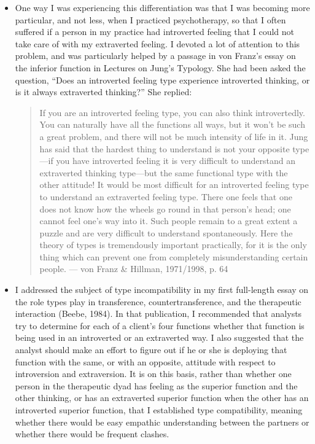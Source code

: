 \begin{itemize}
\item One way I was experiencing this differentiation was that I was becoming
more particular, and not less, when I practiced psychotherapy, so that I often
suffered if a person in my practice had introverted feeling that I could not
take care of with my extraverted feeling. I devoted a lot of attention to this
problem, and was particularly helped by a passage in von Franz's essay on the
inferior function in Lectures on Jung's Typology. She had been asked the
question, ``Does an introverted feeling type experience introverted thinking, or
is it always extraverted thinking?'' She replied:
\begin{quote}
If you are an introverted feeling type, you can also think introvertedly. You
can naturally have all the functions all ways, but it won't be such a great
problem, and there will not be much intensity of life in it. Jung has said that
the hardest thing to understand is not your opposite type—if you have
introverted feeling it is very difficult to understand an extraverted thinking
type—but the same functional type with the other attitude! It would be most
difficult for an introverted feeling type to understand an extraverted feeling
type. There one feels that one does not know how the wheels go round in that
person's head; one cannot feel one's way into it. Such people remain to a great
extent a puzzle and are very difficult to understand spontaneously. Here the
theory of types is tremendously important practically, for it is the only thing
which can prevent one from completely misunderstanding certain people.
--- von Franz \& Hillman, 1971/1998, p. 64
\end{quote}

\item I addressed the subject of type incompatibility in my first full-length
essay on the role types play in transference, countertransference, and the
therapeutic interaction (Beebe, 1984). In that publication, I recommended that
analysts try to determine for each of a client's four functions whether that
function is being used in an introverted or an extraverted way. I also
suggested that the analyst should make an effort to figure out if he or she is
deploying that function with the same, or with an opposite, attitude with
respect to introversion and extraversion. It is on this basis, rather than
whether one person in the therapeutic dyad has feeling as the superior function
and the other thinking, or has an extraverted superior function when the other
has an introverted superior function, that I established type compatibility,
meaning whether there would be easy empathic understanding between the partners
or whether there would be frequent clashes.


\end{itemize}
